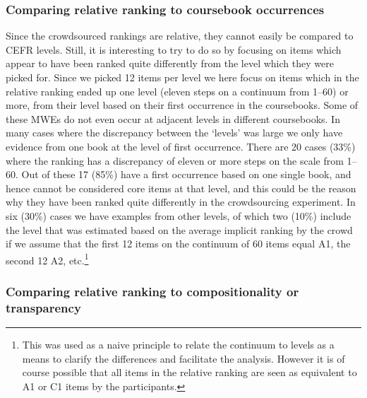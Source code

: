\documentclass[output=paper,colorlinks,citecolor=brown]{langscibook}
\begin{document}
\subsubsection{Comparing relative ranking to coursebook occurrences}\label{sec:MWEbooks}

Since the crowdsourced rankings are relative, they cannot easily be compared to CEFR levels. Still, it is interesting to try to do so by focusing on items which appear to have been ranked quite differently from the level which they were picked for. Since we picked 12 items per level we here focus on items which in the relative ranking ended up one level (eleven steps on a continuum from 1--60) or more, from their level based on their first occurrence in the coursebooks. 
Some of these MWEs do not even occur at adjacent levels in different coursebooks. 
In many cases where the discrepancy between the ‘levels’ was large we only have evidence from one book at the level of first occurrence. There are 20 cases (33\%) where the ranking has a discrepancy of eleven or more steps on the scale from 1--60. Out of these 17 (85\%) have a first occurrence based on one single book, and hence cannot be considered core items at that level, and this could be the reason why they have been ranked quite differently in the crowdsourcing experiment. In six (30\%) cases we have examples from other levels, of which two (10\%) include the level that was estimated based on the average implicit ranking by the crowd if we assume that the first 12 items on the continuum of 60 items equal A1, the second 12 A2, etc.\footnote{This was used as a naive principle to relate the continuum to levels as a means to clarify the differences and facilitate the analysis. However it is of course possible that all items in the relative ranking are seen as equivalent to A1 or C1 items by the participants.}

\subsubsection{Comparing relative ranking to compositionality or transparency}\label{sec:MWEcomposition}
\end{document}
